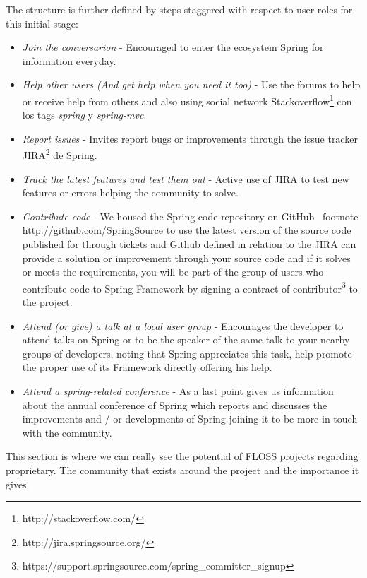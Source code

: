 \documentclass[11pt]{scrartcl}
\begin{document}
\par The structure is further defined by steps staggered with respect to user roles for this initial stage:

\begin{itemize}
    \item \emph{Join the conversarion} - Encouraged to enter the ecosystem Spring for information everyday.
    \item \emph{Help other users (And get help when you need it too)} - Use the forums to help or receive help from others and also using social network Stackoverflow\footnote{http://stackoverflow.com/} con los tags \emph{spring} y \emph{spring-mvc}.
    \item \emph{Report issues} - Invites report bugs or improvements through the issue tracker JIRA\footnote{http://jira.springsource.org/} de Spring.
    \item \emph{Track the latest features and test them out} - Active use of JIRA to test new features or errors helping the community to solve.
    \item \emph{Contribute code} - We housed the Spring code repository on GitHub \ footnote {http://github.com/SpringSource} to use the latest version of the source code published for through tickets and Github defined in relation to the JIRA can provide a solution or improvement through your source code and if it solves or meets the requirements, you will be part of the group of users who contribute code to Spring Framework by signing a contract of contributor\footnote{https://support.springsource.com/spring\_committer\_signup} to the project.
    \item \emph{Attend (or give) a talk at a local user group} - Encourages the developer to attend talks on Spring or to be the speaker of the same talk to your nearby groups of developers, noting that Spring appreciates this task, help promote the proper use of its Framework directly offering his help.
    \item \emph{Attend a spring-related conference} - As a last point gives us information about the annual conference of Spring which reports and discusses the improvements and / or developments of Spring joining it to be more in touch with the community.
\end{itemize}

\par This section is where we can really see the potential of FLOSS projects regarding proprietary. The community that exists around the project and the importance it gives.
\end{document}
